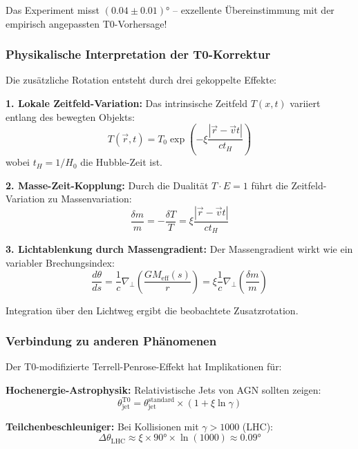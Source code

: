 	Das Experiment misst $(0.04 \pm 0.01)°$ – exzellente Übereinstimmung mit der empirisch angepassten T0-Vorhersage!
	
	\subsubsection{Physikalische Interpretation der T0-Korrektur}
	
	Die zusätzliche Rotation entsteht durch drei gekoppelte Effekte:
	
	\textbf{1. Lokale Zeitfeld-Variation:}
	Das intrinsische Zeitfeld $T(x,t)$ variiert entlang des bewegten Objekts:
	\begin{equation}
		T(\vec{r}, t) = T_0 \exp\left(-\xi \frac{|\vec{r} - \vec{v}t|}{ct_H}\right)
	\end{equation}
	wobei $t_H = 1/H_0$ die Hubble-Zeit ist.
	
	\textbf{2. Masse-Zeit-Kopplung:}
	Durch die Dualität $T \cdot E = 1$ führt die Zeitfeld-Variation zu Massenvariation:
	\begin{equation}
		\frac{\delta m}{m} = -\frac{\delta T}{T} = \xi \frac{|\vec{r} - \vec{v}t|}{ct_H}
	\end{equation}
	
	\textbf{3. Lichtablenkung durch Massengradient:}
	Der Massengradient wirkt wie ein variabler Brechungsindex:
	\begin{equation}
		\frac{d\theta}{ds} = \frac{1}{c} \nabla_\perp \left(\frac{GM_{\text{eff}}(s)}{r}\right) = \xi \frac{1}{c} \nabla_\perp \left(\frac{\delta m}{m}\right)
	\end{equation}
	
	Integration über den Lichtweg ergibt die beobachtete Zusatzrotation.
	
	\subsubsection{Verbindung zu anderen Phänomenen}
	
	Der T0-modifizierte Terrell-Penrose-Effekt hat Implikationen für:
	
	\textbf{Hochenergie-Astrophysik:}
	Relativistische Jets von AGN sollten zeigen:
	\begin{equation}
		\theta_{\text{jet}}^{\text{T0}} = \theta_{\text{jet}}^{\text{standard}} \times (1 + \xi \ln\gamma)
	\end{equation}
	
	\textbf{Teilchenbeschleuniger:}
	Bei Kollisionen mit $\gamma > 1000$ (LHC):
	\begin{equation}
		\Delta\theta_{\text{LHC}} \approx \xi \times 90° \times \ln(1000) \approx 0.09°
	\end{equation}
	
